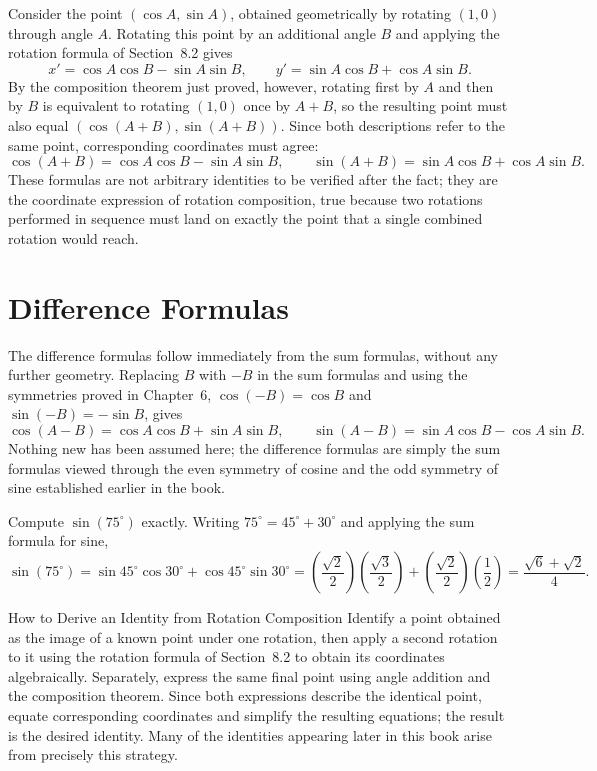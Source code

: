 Consider the point $(\cos A, \sin A)$, obtained geometrically by rotating
$(1,0)$ through angle $A$. Rotating this point by an additional angle $B$
and applying the rotation formula of Section~8.2 gives
\[
x' = \cos A\cos B - \sin A\sin B, \qquad y' = \sin A\cos B + \cos A\sin B.
\]
By the composition theorem just proved, however, rotating first by $A$ and
then by $B$ is equivalent to rotating $(1,0)$ once by $A+B$, so the
resulting point must also equal $(\cos(A+B), \sin(A+B))$. Since both
descriptions refer to the same point, corresponding coordinates must agree:
\[
\boxed{\cos(A+B) = \cos A\cos B - \sin A\sin B}, \qquad
\boxed{\sin(A+B) = \sin A\cos B + \cos A\sin B}.
\]
These formulas are not arbitrary identities to be verified after the fact;
they are the coordinate expression of rotation composition, true because
two rotations performed in sequence must land on exactly the point that a
single combined rotation would reach.

\section{Difference Formulas}

The difference formulas follow immediately from the sum formulas, without
any further geometry. Replacing $B$ with $-B$ in the sum formulas and using
the symmetries proved in Chapter~6, $\cos(-B) = \cos B$ and $\sin(-B) =
-\sin B$, gives
\[
\boxed{\cos(A-B) = \cos A\cos B + \sin A\sin B}, \qquad
\boxed{\sin(A-B) = \sin A\cos B - \cos A\sin B}.
\]
Nothing new has been assumed here; the difference formulas are simply the
sum formulas viewed through the even symmetry of cosine and the odd
symmetry of sine established earlier in the book.

\begin{example}
Compute $\sin(75^\circ)$ exactly. Writing $75^\circ = 45^\circ + 30^\circ$
and applying the sum formula for sine,
\[
\sin(75^\circ) = \sin45^\circ\cos30^\circ + \cos45^\circ\sin30^\circ
= \left(\frac{\sqrt2}{2}\right)\left(\frac{\sqrt3}{2}\right) +
\left(\frac{\sqrt2}{2}\right)\left(\frac12\right)
= \frac{\sqrt6+\sqrt2}{4}.
\]
\end{example}

\begin{algorithmproc}{How to Derive an Identity from Rotation Composition}
Identify a point obtained as the image of a known point under one
rotation, then apply a second rotation to it using the rotation formula of
Section~8.2 to obtain its coordinates algebraically. Separately, express
the same final point using angle addition and the composition theorem.
Since both expressions describe the identical point, equate corresponding
coordinates and simplify the resulting equations; the result is the
desired identity. Many of the identities appearing later in this book arise
from precisely this strategy.
\end{algorithmproc}

